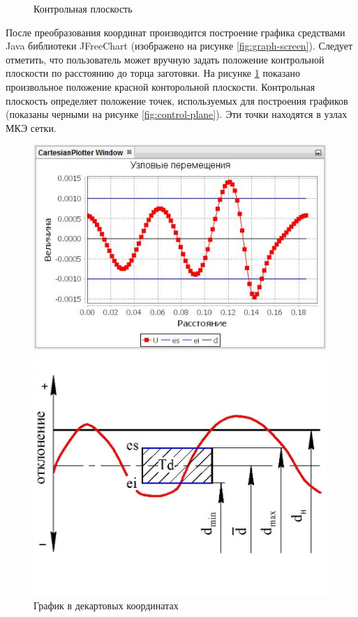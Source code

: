 \documentclass[14pt,oneside,final]{extreport}
\begin{document}
\begin{figure}[t!]
\begin{minipage}[b!]{0.5\textwidth}
			\caption{Контрольная плоскость}
			\label{fig:viewport-screen2}	
		\end{minipage}
	\end{figure}
	
	После преобразования координат производится построение графика средствами Java библиотеки JFreeChart (изображено на рисунке \ref{fig:graph-screen}). Следует отметить, что пользователь может вручную задать  положение контрольной плоскости по расстоянию до торца заготовки. На рисунке  \ref{fig:viewport-screen2} показано произвольное положение красной конторольной плоскости. Контрольная плоскость определяет положение точек, используемых для построения графиков (показаны черными на рисунке \ref{fig:control-plane}). Эти точки находятся в узлах МКЭ сетки. 
	
	
	\begin{figure}[b!]
		\centering	
		\noindent
		\begin{minipage}[b!]{0.55\textwidth}
			\includegraphics[width=0.99\textwidth]{img/cartesian-graph} 
			\caption{График в декартовых координатах}
			\label{fig:cartesian-graph}
		\end{minipage}%
		\begin{minipage}[b!]{0.45\textwidth}
			\includegraphics[width=0.99\textwidth]{img/tolerance} 

\end{minipage}
\end{figure}
\end{document}
